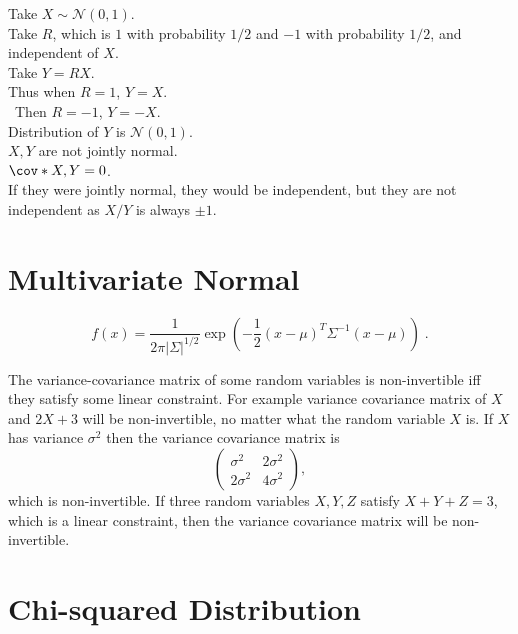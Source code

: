 \begin{example}
Take $X\sim\mathcal{N}(0,1)$.\\
Take $R$, which is $1$ with probability $1/2$ and $-1$ with probability $1/2$, and independent of $X$.\\
Take $Y = RX$.\\
Thus when $R=1$, $Y=X$.\\\
Then $R=-1$, $Y=-X$.\\
Distribution of $Y$ is $\mathcal{N}(0,1)$.\\
$X,Y$ are not jointly normal.\\
$\cov*{X,Y}=0$.\\
If they were jointly normal, they would be independent, but they are not independent as $X/Y$ is always $\pm 1$.
\end{example}

\newpage

\section{Multivariate Normal}

\begin{definition}
\[
f(x) = \frac{1}{2\pi|\Sigma|^{1/2}}
\exp\left(-\frac{1}{2}(x-\mu)^T\Sigma^{-1}(x-\mu)\right)\;.
\]    
\end{definition}

\begin{example}
The variance-covariance matrix of some random variables is non-invertible iff they satisfy some linear constraint. For example variance covariance matrix of $X$ and $2X+3$ will be non-invertible, no matter what the random variable $X$ is. If $X$ has variance $\sigma^2$ then the variance covariance matrix is
\[
\begin{pmatrix}
\sigma^2 & 2\sigma^2\\
2\sigma^2 & 4\sigma^2
\end{pmatrix},
\]
which is non-invertible. If three random variables $X,Y,Z$ satisfy $X+Y+Z=3$, which is a linear constraint, then the variance covariance matrix will be non-invertible.
\end{example}

\newpage
\section{Chi-squared Distribution}

